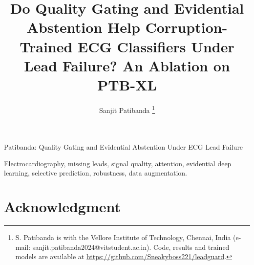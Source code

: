 \documentclass[journal]{IEEEtran}
\begin{document}
\title{Do Quality Gating and Evidential Abstention Help Corruption-Trained ECG Classifiers Under Lead Failure?
An Ablation on PTB-XL}

\author{Sanjit Patibanda%
\thanks{S. Patibanda is with the Vellore Institute of Technology, Chennai, India (e-mail: sanjit.patibanda2024@vitstudent.ac.in).
Code, results and trained models are available at \url{https://github.com/Sneakyboss221/leadguard}.}}

%
{Patibanda: Quality Gating and Evidential Abstention Under ECG Lead Failure}

\maketitle



\begin{IEEEkeywords}
Electrocardiography, missing leads, signal quality, attention, evidential deep learning, selective prediction,
robustness, data augmentation.
\end{IEEEkeywords}













\section*{Acknowledgment}




\end{document}
